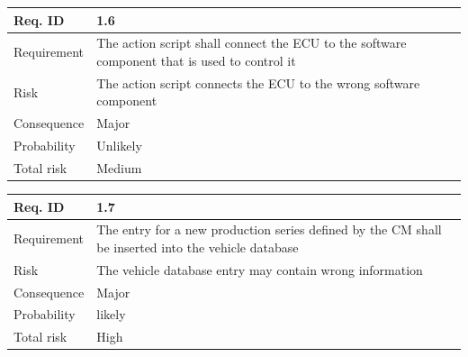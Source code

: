 \begin{table}[H]
\centering
\begin{tabularx}{1.0\textwidth}{
    |p{}%
    |p{}|%
}
\hline
Req. ID
& 1.6
\\
\hline

Requirement
& The action script shall connect the ECU to the software component that is used to control it
\\
\hline

Risk
& 
The action script connects the ECU to the wrong software component
\\
\hline

Consequence
&
Major
\\
\hline

Probability
&
Unlikely
\\
\hline

Total risk
&
Medium
\\
\hline

\end{tabularx}
\end{table}



\begin{table}[H]
\centering
\begin{tabularx}{1.0\textwidth}{
    |p{}%
    |p{}|%
}
\hline
Req. ID
& 1.7
\\
\hline

Requirement
& The entry for a new production series defined by the CM shall be inserted into the vehicle database
\\
\hline

Risk
& 
The vehicle database entry may contain wrong information
\\
\hline

Consequence
& 
Major
\\
\hline

Probability
&
likely   
\\
\hline

Total risk
&
High
\\
\hline

\end{tabularx}
\end{table}


